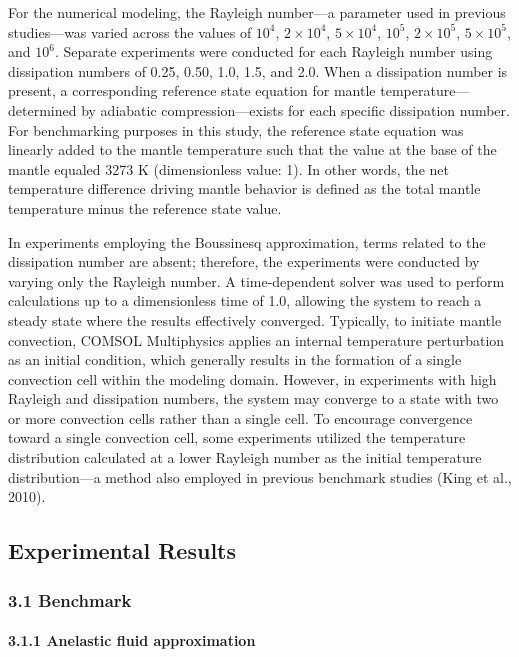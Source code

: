 For the numerical modeling, the Rayleigh number—a parameter used in previous studies—was varied across the values 
of $10^4$, $2\times 10^4$, $5\times 10^4$, $10^5$, $2\times 10^5$, $5\times 10^5$, and $10^6$. 
Separate experiments were conducted for each Rayleigh number using dissipation numbers of 0.25, 0.50, 1.0, 1.5, and 2.0. When a dissipation number is present, a corresponding reference state equation for mantle temperature—determined by adiabatic compression—exists for each specific dissipation number. For benchmarking purposes in this study, the reference state equation was linearly added to the mantle temperature such that the value at the base of the mantle equaled 3273 K (dimensionless value: 1). In other words, the net temperature difference driving mantle behavior is defined as the total mantle temperature minus the reference state value.


In experiments employing the Boussinesq approximation, terms related to the dissipation number are absent; therefore, the experiments were conducted by varying only the Rayleigh number. A time-dependent solver was used to perform calculations up to a dimensionless time of 1.0, allowing the system to reach a steady state where the results effectively converged. Typically, to initiate mantle convection, COMSOL Multiphysics applies an internal temperature perturbation as an initial condition, which generally results in the formation of a single convection cell within the modeling domain. However, in experiments with high Rayleigh and dissipation numbers, the system may converge to a state with two or more convection cells rather than a single cell. To encourage convergence toward a single convection cell, some experiments utilized the temperature distribution calculated at a lower Rayleigh number as the initial temperature distribution—a method also employed in previous benchmark studies (King et al., 2010).

\subsection{Experimental Results}



\subsubsection{3.1 Benchmark}

\paragraph{3.1.1 Anelastic fluid approximation}

